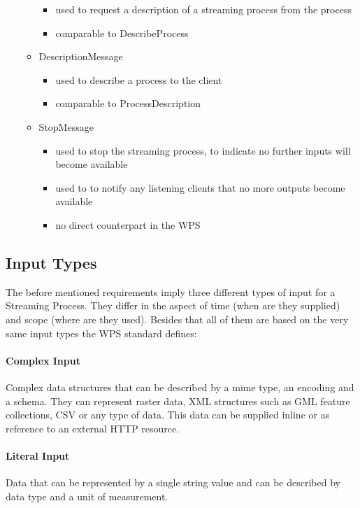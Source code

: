 \begin{itemize}
\begin{itemize}
				\begin{itemize}
					\item used to request a description of a streaming process from the process
					\item comparable to DescribeProcess
				\end{itemize}
				\item DescriptionMessage

				\begin{itemize}
					\item used to describe a process to the client
					\item comparable to ProcessDescription
				\end{itemize}
				\item StopMessage

				\begin{itemize}
					\item used to stop the streaming process, to indicate no further inputs will become available
					\item used to to notify any listening clients that no more outputs become available
					\item no direct counterpart in the WPS
				\end{itemize}
			\end{itemize}
		\end{itemize}
	\subsection{Input Types}
		\label{sec:streaming:input}
		The before mentioned requirements imply three different types of input for a Streaming Process. They differ in the aspect of time (when are they supplied) and scope (where are they used). Besides that all of them are based on the very same input types the \ac{WPS} standard defines:
		\paragraph{Complex Input}
			Complex data structures that can be described by a mime type, an encoding and a schema. They can represent raster data, XML structures such as GML feature collections, CSV or any type of data. This data can be supplied inline or as reference to an external HTTP resource.
		\paragraph{Literal Input}
			Data that can be represented by a single string value and can be described by data type and a unit of measurement.
